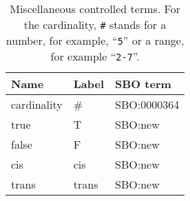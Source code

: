 \begin{table}[h]
  \centering
  \begin{tabular}{l>{\ttfamily}l>{\ttfamily}l}
    \toprule
    \textbf{Name}   & \textbf{\rmfamily Label} & \textbf{\rmfamily SBO term} \\
    \midrule
    cardinality    & \#  & SBO:0000364\\
    true           & T     & SBO:new\\
    false          & F     & SBO:new\\
    cis            & cis   & SBO:new\\
    trans          & trans & SBO:new\\
    \bottomrule
  \end{tabular}
  \caption{Miscellaneous controlled terms. For the cardinality, \texttt{\#} stands for a
    number, for example, ``\texttt{5}'' or a range, for example ``\texttt{2-7}''.}
  \label{tab:cardinality-cv}
\end{table}

\normalcolor
